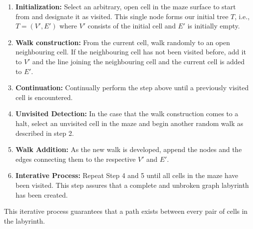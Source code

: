 \documentclass{article}
\begin{document}
\begin{enumerate}
    \item \textbf{Initialization:} Select an arbitrary, open cell in the maze surface to start from and designate it as visited. This single node forms our initial tree \( T \), i.e., \( T = (V', E') \) where \( V' \) consists of the initial cell and \( E' \) is initially empty.

    \item \textbf{Walk construction:} From the current cell, walk randomly to an open neighbouring cell. If the neighbouring cell has not been visited before, add it to \( V' \) and the line joining the neighbouring cell and the current cell is added to \( E' \).

    \item \textbf{Continuation:} Continually perform the step above until a previously visited cell is encountered.

    \item \textbf{Unvisited Detection:} In the case that the walk construction comes to a halt, select an unvisited cell in the maze and begin another random walk as described in step 2.

    \item \textbf{Walk Addition:} As the new walk is developed, append the nodes and the edges connecting them to the respective \( V' \) and \( E' \).

    \item \textbf{Interative Process:} Repeat Step 4 and 5 until all cells in the maze have been visited. This step assures that a complete and unbroken graph labyrinth has been created.
\end{enumerate}

This iterative process guarantees that a path exists between every pair of cells in the labyrinth.
\end{document}
